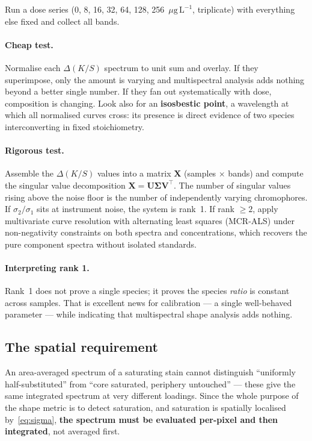 \documentclass[11pt,a4paper]{article}
\newcommand{\ptl}{\ensuremath{\mu\mathrm{g\,L^{-1}}}}
\begin{document}
Run a dose series (0, 8, 16, 32, 64, 128, 256~\ptl{}, triplicate) with
everything else fixed and collect all bands.

\paragraph{Cheap test.} Normalise each $\Delta(K/S)$ spectrum to unit sum
and overlay. If they superimpose, only the amount is varying and
multispectral analysis adds nothing beyond a better single number. If they
fan out systematically with dose, composition is changing. Look also for an
\textbf{isosbestic point}, a wavelength at which all normalised curves
cross: its presence is direct evidence of two species interconverting in
fixed stoichiometry.

\paragraph{Rigorous test.} Assemble the $\Delta(K/S)$ values into a matrix
$\mathbf{X}$ (samples $\times$ bands) and compute the singular value
decomposition $\mathbf{X} = \mathbf{U}\boldsymbol{\Sigma}\mathbf{V}^{\!\top}$.
The number of singular values rising above the noise floor is the number of
independently varying chromophores. If $\sigma_2/\sigma_1$ sits at
instrument noise, the system is rank~1. If rank $\geq 2$, apply
multivariate curve resolution with alternating least squares (MCR-ALS) under
non-negativity constraints on both spectra and concentrations, which
recovers the pure component spectra without isolated standards.

\paragraph{Interpreting rank 1.} Rank~1 does not prove a single species; it
proves the species \emph{ratio} is constant across samples. That is
excellent news for calibration --- a single well-behaved parameter --- while
indicating that multispectral shape analysis adds nothing.

\subsection{The spatial requirement}

An area-averaged spectrum of a saturating stain cannot distinguish
``uniformly half-substituted'' from ``core saturated, periphery untouched''
--- these give the same integrated spectrum at very different loadings.
Since the whole purpose of the shape metric is to detect saturation, and
saturation is spatially localised by~\eqref{eq:sigma}, \textbf{the spectrum
must be evaluated per-pixel and then integrated}, not averaged first.
\end{document}
